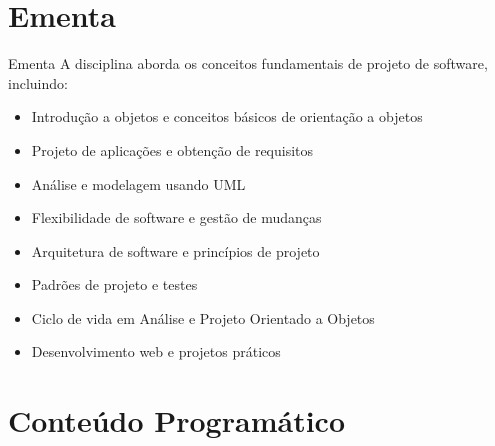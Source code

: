 \documentclass[aspectratio=169]{beamer}
\begin{document}
\section{Ementa}

\begin{frame}{Ementa}
A disciplina aborda os conceitos fundamentais de projeto de software, incluindo:
\begin{itemize}
    \item Introdução a objetos e conceitos básicos de orientação a objetos
    \item Projeto de aplicações e obtenção de requisitos
    \item Análise e modelagem usando UML
    \item Flexibilidade de software e gestão de mudanças
    \item Arquitetura de software e princípios de projeto
    \item Padrões de projeto e testes
    \item Ciclo de vida em Análise e Projeto Orientado a Objetos
    \item Desenvolvimento web e projetos práticos
\end{itemize}
\end{frame}

\section{Conteúdo Programático}
\end{document}
